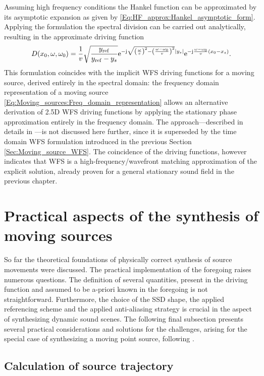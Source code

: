 Assuming high frequency conditions the Hankel function can be approximated by its asymptotic expansion as given by \eqref{Eq:HF_approx:Hankel_asymptotic_form}.
Applying the formulation the spectral division can be carried out analytically, resulting in the approximate driving function
\begin{equation}
D(x_0,\omega,\omega_0) = 
\frac{1}{v}
\sqrt{\frac{y_{\mathrm{ref}}}{y_{\mathrm{ref}}- y_s}}
\mathrm{e}^{-\mathrm{j} \sqrt{ \left(\frac{\omega}{c}\right)^2 - \left( \frac{\omega-\omega_0}{v} \right)^2}|y_s|}
\mathrm{e}^{-\mathrm{j} \frac{\omega-\omega_0}{v} (x_0 - x_s)}.
\end{equation}
This formulation coincides with the implicit WFS driving functions for a moving source, derived entirely in the spectral domain: 
the frequency domain representation of a moving source \eqref{Eq:Moving_sources:Freq_domain_representation} allows an alternative derivation of 2.5D WFS driving functions by applying the stationary phase approximation entirely in the frequency domain.
The approach---described in details in \cite{firtha2015sound}---is not discussed here further, since it is superseded by the time domain WFS formulation introduced in the previous Section \ref{Sec:Moving_source_WFS}.
The coincidence of the driving functions, however indicates that WFS is a high-frequency/wavefront matching approximation of the explicit solution, already proven for a general stationary sound field in the previous chapter.

\section{Practical aspects of the synthesis of moving sources}

So far the theoretical foundations of physically correct synthesis of source movements were discussed.
The practical implementation of the foregoing raises numerous questions.
The definition of several quantities, present in the driving function and assumed to be a-priori known in the foregoing is not straightforward.
Furthermore, the choice of the SSD shape, the applied referencing scheme and the applied anti-aliasing strategy is crucial in the aspect of synthesizing dynamic sound scenes.
The following final subsection presents several practical considerations and solutions for the challenges, arising for the special case of synthesizing a moving point source, following \cite{Firtha2018_daga_moving_source}.

\subsection{Calculation of source trajectory}

